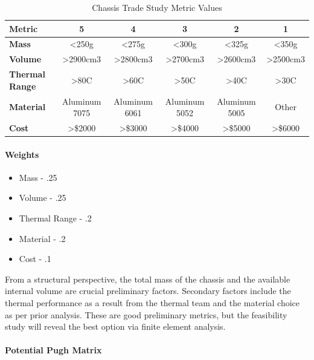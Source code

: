 \documentclass{ece}
\begin{document}
\begin{table}[H]
\centering
\begin{tabular}{|l|c|c|c|c|c|} 
\hline
    \textbf{Metric} & \textbf{5} & \textbf{4} & \textbf{3} & \textbf{2} & \textbf{1}
    \\
\hline
    \textbf{Mass} & <250g & <275g & <300g & <325g & <350g
    \\
\hline
    \textbf{Volume} & >2900cm3 & >2800cm3 & >2700cm3 & >2600cm3 & >2500cm3
    \\
\hline
    \textbf{Thermal Range} & >80C & >60C & >50C & >40C & >30C
    \\
\hline
    \textbf{Material} & Aluminum 7075 & Aluminum 6061 & Aluminum 5052 & Aluminum 5005 & Other
    \\
\hline
    \textbf{Cost} & >\$2000 & >\$3000 & >\$4000 & >\$5000 & >\$6000
    \\

\hline
\end{tabular}
\caption{Chassis Trade Study Metric Values}
\label{tbl:chassis_Metric_Scores}
\end{table}

\paragraph{Weights}
\begin{itemize}
    \item Mass - .25
    \item Volume - .25
    \item Thermal Range - .2
    \item Material - .2
    \item Cost - .1
\end{itemize}

From a structural perspective, the total mass of the chassis and the available internal volume are crucial preliminary factors. Secondary factors include the thermal performance as a result from the thermal team and the material choice as per prior analysis. These are good preliminary metrics, but the feasibility study will reveal the best option via finite element analysis.

\paragraph{Potential Pugh Matrix}
\end{document}
